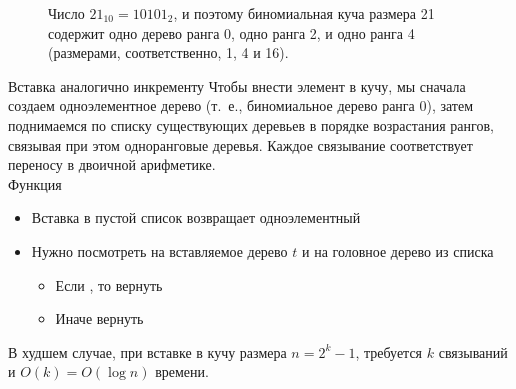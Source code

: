  
 \begin{frame}[fragile]{}
 \begin{figure}[h]
   \centering
   
   \caption{Число $21_{10} = 10101_2$, и поэтому
     биномиальная куча размера 21 содержит одно дерево ранга 0, одно ранга
     2, и одно ранга 4 (размерами, соответственно, 1, 4 и 16).}
 \end{figure}
 
 \end{frame}
 
 
\begin{frame}{Вставка аналогично инкременту}
Чтобы внести элемент в кучу, мы сначала создаем одноэлементное дерево (т.~е., биномиальное дерево ранга 0), затем поднимаемся по списку существующих деревьев в порядке возрастания рангов, связывая при этом одноранговые деревья. Каждое связывание соответствует переносу в двоичной арифметике.\\
 
Функция 
\begin{itemize}
\item Вставка в пустой список возвращает одноэлементный
\item Нужно посмотреть на вставляемое дерево $t$ и на головное дерево  из списка  
\begin{itemize}
\item Если , то вернуть  
\item Иначе вернуть  
\end{itemize}
\end{itemize}
\vspace{1em}

В худшем случае, при вставке в кучу размера $n = 2^k -1$, требуется
 $k$ связываний и $O(k) = O(\log n)$ времени.
\end{frame}
 
